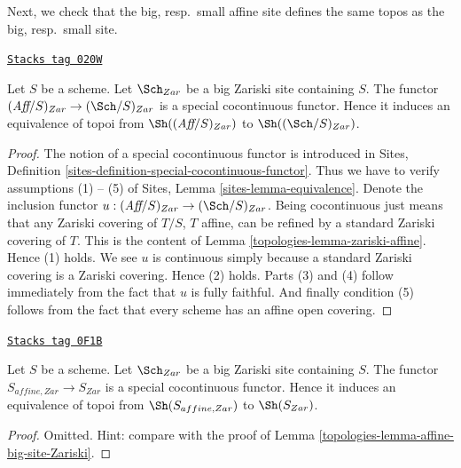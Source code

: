 Next, we check that the big, resp.\ small affine site defines the same
topos as the big, resp.\ small site.

\begin{lemma}
\label{topologies-lemma-affine-big-site-Zariski}
\href{https://stacks.math.columbia.edu/tag/020W}{\texttt{Stacks tag 020W}}

Let $S$ be a scheme. Let $\Sch_{Zar}$ be a big Zariski
site containing $S$.
The functor $(\textit{Aff}/S)_{Zar} \to (\Sch/S)_{Zar}$
is a special cocontinuous functor. Hence it induces an equivalence
of topoi from $\Sh((\textit{Aff}/S)_{Zar})$ to
$\Sh((\Sch/S)_{Zar})$.
\end{lemma}

\begin{proof}

The notion of a special cocontinuous functor is introduced in
Sites, Definition \ref{sites-definition-special-cocontinuous-functor}.
Thus we have to verify assumptions (1) -- (5) of
Sites, Lemma \ref{sites-lemma-equivalence}.
Denote the inclusion functor
$u : (\textit{Aff}/S)_{Zar} \to (\Sch/S)_{Zar}$.
Being cocontinuous just means that any Zariski covering of
$T/S$, $T$ affine, can be refined by a standard Zariski covering of $T$.
This is the content of
Lemma \ref{topologies-lemma-zariski-affine}.
Hence (1) holds. We see $u$ is continuous simply because a standard
Zariski covering is a Zariski covering. Hence (2) holds.
Parts (3) and (4) follow immediately from the fact that $u$ is
fully faithful. And finally condition (5) follows from the
fact that every scheme has an affine open covering.
\end{proof}

\begin{lemma}
\label{topologies-lemma-alternative-zariski}
\href{https://stacks.math.columbia.edu/tag/0F1B}{\texttt{Stacks tag 0F1B}}

Let $S$ be a scheme.  Let $\Sch_{Zar}$ be a big Zariski
site containing $S$. The functor $S_{affine, Zar} \to S_{Zar}$
is a special cocontinuous functor. Hence it induces an equivalence
of topoi from $\Sh(S_{affine, Zar})$ to $\Sh(S_{Zar})$.
\end{lemma}

\begin{proof}

Omitted. Hint: compare with the proof of
Lemma \ref{topologies-lemma-affine-big-site-Zariski}.
\end{proof}

